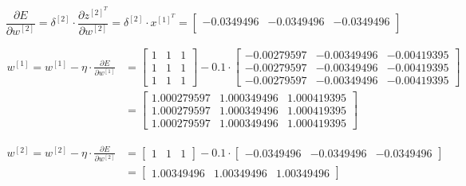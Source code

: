 \documentclass[12pt]{article}
\begin{document}
\begin{enumerate}[leftmargin=\labelsep]
          \begin{equation*}
              \frac{\partial E}{\partial w^{[2]}} = \delta^{[2]} \cdot
              \frac{\partial z^{[2]^T}}{\partial w^{[2]}}
              = \delta^{[2]} 
               \cdot x^{[1]^T}
              = \begin{bmatrix}
                -0.0349496 & -0.0349496 & -0.0349496\\
              \end{bmatrix}
          \end{equation*}

          \begin{equation*}
            \begin{aligned}
              w^{[1]} = w^{[1]} - \eta \cdot \frac{\partial E}{\partial w^{[1]}}
              &= \begin{bmatrix}
                  1 & 1 & 1 \\
                  1 & 1 & 1 \\
                  1 & 1 & 1
                \end{bmatrix} - 0.1 \cdot \begin{bmatrix}
                  - 0.00279597 & - 0.00349496 & - 0.00419395 \\
                  - 0.00279597 & - 0.00349496 & - 0.00419395 \\
                  - 0.00279597 & - 0.00349496 & - 0.00419395
                \end{bmatrix} \\
              &= \begin{bmatrix}
                1.000279597 & 1.000349496 & 1.000419395 \\
                1.000279597 & 1.000349496 & 1.000419395 \\
                1.000279597 & 1.000349496 & 1.000419395
                \end{bmatrix}
            \end{aligned}
          \end{equation*}

          \begin{equation*}
            \begin{aligned}
              w^{[2]} = w^{[2]} - \eta \cdot \frac{\partial E}{\partial w^{[2]}}
              &= \begin{bmatrix}
                  1 & 1 & 1
                \end{bmatrix} - 0.1 \cdot \begin{bmatrix}
                  - 0.0349496 & - 0.0349496 & - 0.0349496
                \end{bmatrix} \\
              &= \begin{bmatrix}
                1.00349496 & 1.00349496 & 1.00349496
                \end{bmatrix}
            \end{aligned}
          \end{equation*}


\end{enumerate}
\end{document}
